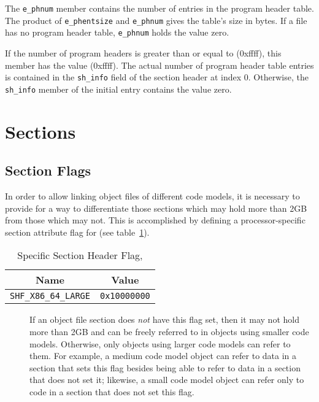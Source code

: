 The \texttt{e_phnum} member contains the number of entries in the program
header table. The product of
\texttt{e_phentsize} and \texttt{e_phnum} gives the table's size in bytes.
If a file has no program header table, \texttt{e_phnum} holds the value zero.

If the number of program headers is greater than or equal to
 (0xffff), this member has the value  (0xffff).
The actual number of program header table entries is contained in
the \texttt{sh_info} field of the section header at index 0. Otherwise,
the \texttt{sh_info} member of the initial entry contains the value zero.

\section{Sections}

\subsection{Section Flags}

In order to allow linking object files of different code models, it is
necessary to provide for a way to differentiate those sections which may hold
more than 2GB from those which may not. This is accomplished by defining a
processor-specific section attribute flag for 
(see table~\ref{sh_flags}).

\begin{table}[H]
\Hrule
  \caption{\xARCH Specific Section Header Flag, }
  \label{sh_flags}
  \begin{center}
    \begin{tabular}[t]{l|l}
      \multicolumn{1}{c}{Name} & \multicolumn{1}{c}{Value} \\
      \hline
      \texttt{SHF_X86_64_LARGE} & \texttt{0x10000000}
    \end{tabular}
  \end{center}
\Hrule
\end{table}

\begin{description}
 \item[] If an object file section does
   {\em not} have
   this flag set, then it may not hold more than 2GB and
   can be freely referred to in objects using smaller code models.
   Otherwise, only objects using larger code models can refer to them.
   For example, a medium code model object can refer to data in a
   section that sets this flag besides being able to refer to data in a
   section that does not set it; likewise, a small code model object can
   refer only to code in a section that does not set this flag.
\end{description}

